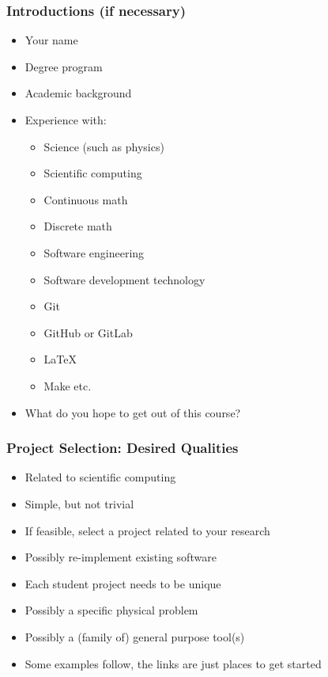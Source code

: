 \documentclass[t,12pt,numbers,fleqn]{beamer}
\begin{document}

\begin{frame}
\frametitle{Introductions (if necessary)}

\begin{itemize}
\item Your name
\item Degree program
\item Academic background
\item Experience with:
\begin{itemize}
\item Science (such as physics)
\item Scientific computing
\item Continuous math
\item Discrete math
\item Software engineering
\item Software development technology
\bi
\item Git
\item GitHub or GitLab
\item LaTeX
\item Make etc.
\ei
\end{itemize}
\item What do you hope to get out of this course?
\end{itemize}

\end{frame}


\begin{frame}
\frametitle{Project Selection: Desired Qualities}
\begin{itemize}
\item Related to scientific computing
\item Simple, but not trivial
\item If feasible, select a project related to your research
\item Possibly re-implement existing software
\item Each student project needs to be unique
\item Possibly a specific physical problem
\item Possibly a (family of) general purpose tool(s)
\item Some examples follow, the links are just places to get started
\end{itemize}
\end{frame}
\end{document}

